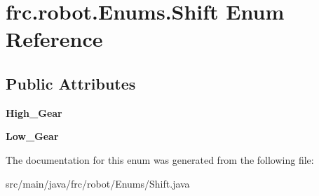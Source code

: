 \hypertarget{enumfrc_1_1robot_1_1_enums_1_1_shift}{}\section{frc.\+robot.\+Enums.\+Shift Enum Reference}
\label{enumfrc_1_1robot_1_1_enums_1_1_shift}
\subsection*{Public Attributes}
\begin{DoxyCompactItemize}
\item 
\mbox{\label{enumfrc_1_1robot_1_1_enums_1_1_shift_a66efd5ef2833112e313f06303c7c6003}} 
{\bfseries High\+\_\+\+Gear}
\item 
\mbox{\label{enumfrc_1_1robot_1_1_enums_1_1_shift_a057c3458651c7a916da4241ae52b56d0}} 
{\bfseries Low\+\_\+\+Gear}
\end{DoxyCompactItemize}


The documentation for this enum was generated from the following file\+:\begin{DoxyCompactItemize}
\item 
src/main/java/frc/robot/\+Enums/Shift.\+java\end{DoxyCompactItemize}
